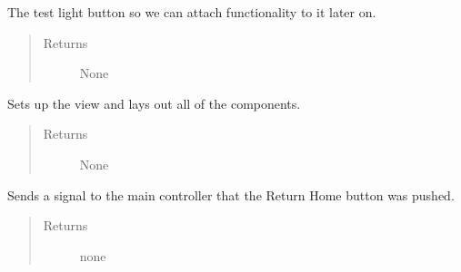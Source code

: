 \documentclass[letterpaper,10pt,english]{sphinxmanual}
\begin{document}
\begin{fulllineitems}
\begin{fulllineitems}
\begin{quote}
\begin{description}
\end{description}\end{quote}

\end{fulllineitems}


\begin{fulllineitems}
\label{\detokenize{index:src.Views.View_VerifySetupScreen.VerifySetupWindow.del_BtnTestLight}}
The test light button so we can attach functionality to it later on.
\begin{quote}\begin{description}
\item[{Returns}] \leavevmode
None

\end{description}\end{quote}

\end{fulllineitems}


\begin{fulllineitems}
\label{\detokenize{index:src.Views.View_VerifySetupScreen.VerifySetupWindow.initView}}
Sets up the view and lays out all of the components.
\begin{quote}\begin{description}
\item[{Returns}] \leavevmode
None

\end{description}\end{quote}

\end{fulllineitems}


\begin{fulllineitems}
\label{\detokenize{index:src.Views.View_VerifySetupScreen.VerifySetupWindow.returnHome}}
Sends a signal to the main controller that the Return Home button was pushed.
\begin{quote}\begin{description}
\item[{Returns}] \leavevmode
none


\end{description}
\end{quote}
\end{fulllineitems}
\end{fulllineitems}
\end{document}
